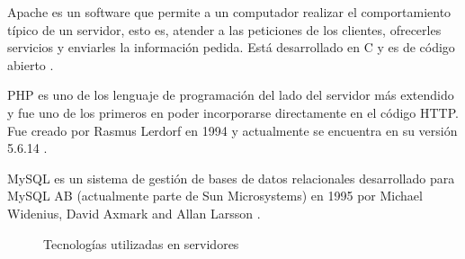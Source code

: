 Apache es un software que permite a un computador realizar el comportamiento típico de un servidor, esto es, atender a las peticiones de los clientes, ofrecerles servicios y enviarles la información pedida. Está desarrollado en C y es de código abierto \cite{Apac15}.

PHP es uno de los lenguaje de programación del lado del servidor más extendido y fue uno de los primeros en poder incorporarse directamente en el código \ac{HTTP}. Fue creado por Rasmus Lerdorf en 1994 y actualmente se encuentra en su versión 5.6.14 \cite{Hist15}.

MySQL es un sistema de gestión de bases de datos relacionales desarrollado para MySQL AB (actualmente parte de Sun Microsystems) en 1995 por Michael Widenius, David Axmark and Allan Larsson \cite{Data14}.

\begin{figure}[h!btp]
	\begin{adjustbox}{minipage=\linewidth, fbox}
		\centering
		\hspace{10mm}
		\vspace{10mm}
	\end{adjustbox}
	\caption{Tecnologías utilizadas en servidores}
	\label{fig:mysql_php_apache}
\end{figure}

